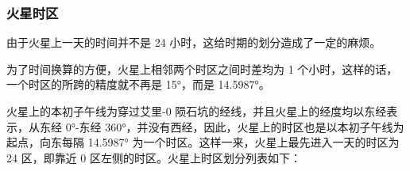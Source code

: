 \documentclass[letterpaper,10pt]{sphinxmanual}
\begin{document}

\subsubsection{火星时区}
\label{mars:index-4}\label{mars:id23}
由于火星上一天的时间并不是 24 小时，这给时期的划分造成了一定的麻烦。

为了时间换算的方便，火星上相邻两个时区之间时差均为 1 个小时，这样的话，一个时区的所跨的精度就不再是 15°，而是 14.5987°。

火星上的本初子午线为穿过艾里-0 陨石坑的经线，并且火星上的经度均以东经表示，从东经 0°-东经 360°，并没有西经，因此，火星上的时区也是以本初子午线为起点，向东每隔 14.5987° 为一个时区。这样一来，火星上最先进入一天的时区为 24 区，即靠近 0 区左侧的时区。火星上时区划分列表如下：
\end{document}
